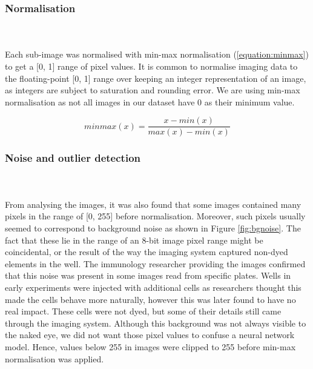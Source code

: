 \bigskip
\subsubsection{Normalisation}

\hfill\\
\hfill\\
Each sub-image was normalised with min-max normalisation (\autoref{equation:minmax}) to get a [0, 1] range of pixel values. It is common to normalise imaging data to the floating-point [0, 1] range over keeping an integer representation of an image, as integers are subject to saturation and rounding error. We are using min-max normalisation as not all images in our dataset have 0 as their minimum value.

\begin{equation}
    minmax(x) = \frac{x - min(x)}{max(x) - min(x)}
\label{equation:minmax}
\end{equation}

\bigskip
\subsubsection{Noise and outlier detection}

\hfill\\
\hfill\\
From analysing the images, it was also found that some images contained many pixels in the range of [0, 255] before normalisation. Moreover, such pixels usually seemed to correspond to background noise as shown in Figure \ref{fig:bgnoise}. The fact that these lie in the range of an 8-bit image pixel range might be coincidental, or the result of the way the imaging system captured non-dyed elements in the well. The immunology researcher providing the images confirmed that this noise was present in some images read from specific plates. Wells in early experiments were injected with additional cells as researchers thought this made the cells behave more naturally, however this was later found to have no real impact. These cells were not dyed, but some of their details still came through the imaging system. Although this background was not always visible to the naked eye, we did not want those pixel values to confuse a neural network model. Hence, values below 255 in images were clipped to 255 before min-max normalisation was applied.

